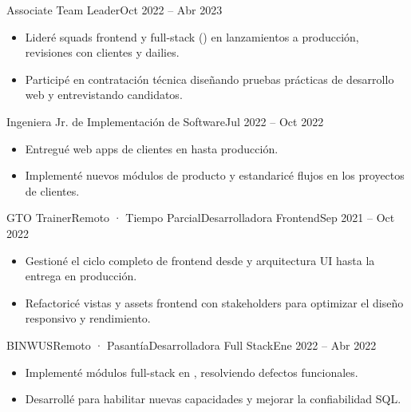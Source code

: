 
\begin{TimelineRole}{Associate Team Leader}{Oct 2022 – Abr 2023}
    \begin{itemize}
        \item Lideré squads frontend y full-stack () en lanzamientos a producción, revisiones con clientes y dailies.
        \item Participé en contratación técnica diseñando pruebas prácticas de desarrollo web y entrevistando candidatos.
    \end{itemize}
\end{TimelineRole}

\begin{TimelineRole}[last]{Ingeniera Jr. de Implementación de Software}{Jul 2022 – Oct 2022}
    \begin{itemize}
        \item Entregué web apps de clientes en  hasta producción.
        \item Implementé nuevos módulos de producto y estandaricé flujos  en los proyectos de clientes.
    \end{itemize}
\end{TimelineRole}

\begin{SingleRole}{GTO Trainer}{Remoto · Tiempo Parcial}{Desarrolladora Frontend}{Sep 2021 – Oct 2022}
    \begin{itemize}
        \item Gestioné el ciclo completo de frontend desde  y arquitectura UI hasta la entrega en producción.
        \item Refactoricé vistas y assets frontend con stakeholders para optimizar el diseño responsivo y rendimiento.
    \end{itemize}
\end{SingleRole}

\begin{SingleRole}[last]{BINWUS}{Remoto · Pasantía}{Desarrolladora Full Stack}{Ene 2022 – Abr 2022}
    \begin{itemize}
        \item Implementé módulos full-stack en , resolviendo defectos funcionales.
        \item Desarrollé  para habilitar nuevas capacidades y mejorar la confiabilidad SQL.
    \end{itemize}
\end{SingleRole}
